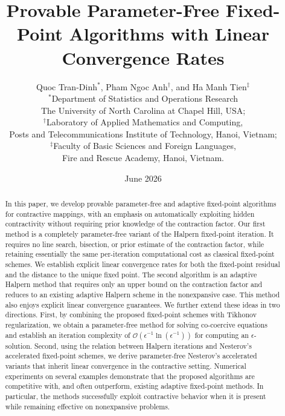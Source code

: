 \documentclass{article}
\title{Provable Parameter-Free Fixed-Point Algorithms with Linear Convergence Rates}
\author{
Quoc Tran-Dinh$^{*}$, Pham Ngoc Anh$^{\dagger}$, and Ha Manh Tien$^{\ddagger}$\\
$^{*}$Department of Statistics and Operations Research\\The University of North Carolina at Chapel Hill, USA; \\
$^{\dagger}$Laboratory of Applied Mathematics and Computing, \\
Posts and Telecommunications Institute of Technology, Hanoi, Vietnam;\\
$^{\ddagger}$Faculty of Basic Sciences and Foreign Languages,\\
Fire and Rescue Academy, Hanoi, Vietnam.
}
\date{June 2026}
\theoremstyle{plain}
\theoremstyle{definition}
\newcommand{\0}{\boldsymbol{0}}
\begin{document}
\maketitle
\begin{abstract}
In this paper, we develop provable parameter-free and adaptive fixed-point algorithms for contractive mappings, with an emphasis on automatically exploiting hidden contractivity without requiring prior knowledge of the contraction factor. 
Our first method is a completely parameter-free variant of the Halpern fixed-point iteration. 
It requires no line search, bisection, or prior estimate of the contraction factor, while retaining essentially the same per-iteration computational cost as classical fixed-point schemes. 
We establish explicit linear convergence rates for both the fixed-point residual and the distance to the unique fixed point. 
The second algorithm is an adaptive Halpern method that requires only an upper bound on the contraction factor and reduces to an existing adaptive Halpern scheme in the nonexpansive case. 
This method also enjoys explicit linear convergence guarantees. 
We further extend these ideas in two directions. 
First, by combining the proposed fixed-point schemes with Tikhonov regularization, we obtain a parameter-free method for solving co-coercive equations and establish an iteration complexity of $\mathcal{O}({\epsilon^{-1}\ln(\epsilon^{-1})})$ for computing an $\epsilon$-solution. 
Second, using the relation between Halpern iterations and Nesterov's accelerated fixed-point schemes, we derive parameter-free Nesterov's accelerated variants that inherit linear convergence in the contractive setting.
Numerical experiments on several examples demonstrate that the proposed algorithms are competitive with, and often outperform, existing adaptive fixed-point methods. In particular, the methods successfully exploit contractive behavior when it is present while remaining effective on nonexpansive problems. 
\end{abstract}

\end{document}
